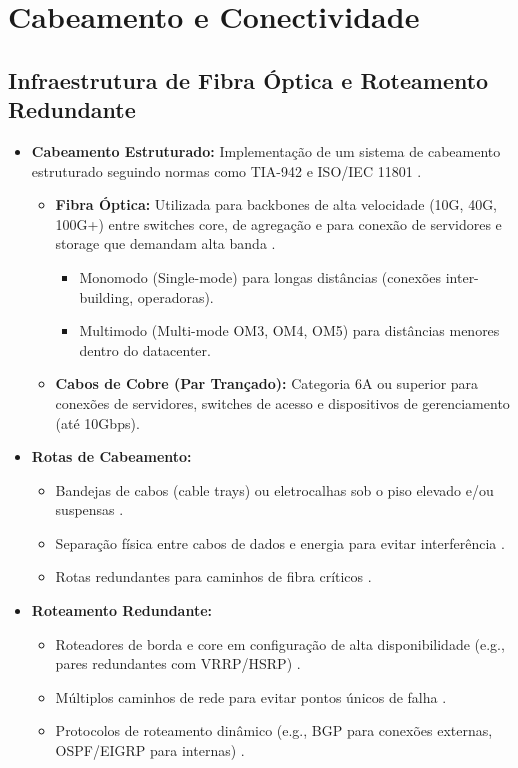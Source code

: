 \documentclass[
	12pt,				%
	oneside,			%
	a4paper,			%
	english,			%
	brazil				%
	]{abntex2unama}
\begin{document}
\chapter{Cabeamento e Conectividade}
\section{Infraestrutura de Fibra Óptica e Roteamento Redundante}
\begin{itemize}
	\item \textbf{Cabeamento Estruturado:} Implementação de um sistema de cabeamento estruturado seguindo normas como TIA-942 e ISO/IEC 11801 \cite{datacenter_networking}.
	      \begin{itemize}
		      \item \textbf{Fibra Óptica:} Utilizada para backbones de alta velocidade (10G, 40G, 100G+) entre switches core, de agregação e para conexão de servidores e storage que demandam alta banda \cite{network_fabric}.
		            \begin{itemize}
			            \item Monomodo (Single-mode) para longas distâncias (conexões inter-building, operadoras).
			            \item Multimodo (Multi-mode OM3, OM4, OM5) para distâncias menores dentro do datacenter.
		            \end{itemize}
		      \item \textbf{Cabos de Cobre (Par Trançado):} Categoria 6A ou superior para conexões de servidores, switches de acesso e dispositivos de gerenciamento (até 10Gbps).
	      \end{itemize}
	\item \textbf{Rotas de Cabeamento:}
	      \begin{itemize}
		      \item Bandejas de cabos (cable trays) ou eletrocalhas sob o piso elevado e/ou suspensas \cite{design_principles}.
		      \item Separação física entre cabos de dados e energia para evitar interferência \cite{power_distribution}.
		      \item Rotas redundantes para caminhos de fibra críticos \cite{reliability_engineering}.
	      \end{itemize}
	\item \textbf{Roteamento Redundante:}
	      \begin{itemize}
		      \item Roteadores de borda e core em configuração de alta disponibilidade (e.g., pares redundantes com VRRP/HSRP) \cite{network_fabric}.
		      \item Múltiplos caminhos de rede para evitar pontos únicos de falha \cite{disaster_recovery}.
		      \item Protocolos de roteamento dinâmico (e.g., BGP para conexões externas, OSPF/EIGRP para internas) \cite{datacenter_networking}.
	      \end{itemize}
\end{itemize}
\end{document}
